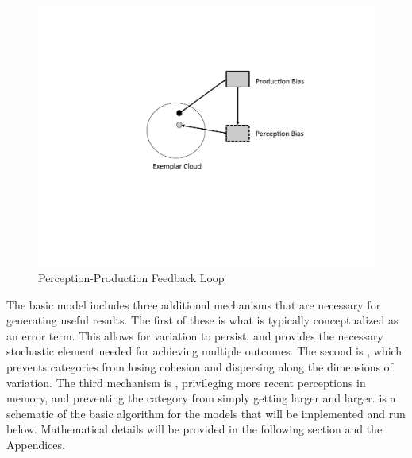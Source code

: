 \begin{figure}[H]

\begin{centering}
\includegraphics[scale=0.5]{figures/P-PLoop.pdf}\caption{\label{fig:Feedback Loop}Perception-Production Feedback Loop}
\par\end{centering}
\end{figure}

The basic  model includes three additional mechanisms that
are necessary for generating useful results. The first of these is
what is typically conceptualized as an error term. This allows for
variation to persist, and provides the necessary stochastic element
needed for achieving multiple outcomes. The second is ,
which prevents categories from losing cohesion and dispersing along
the dimensions of variation. The third mechanism is ,
privileging more recent perceptions in memory, and preventing the
category from simply getting larger and larger. 
is a schematic of the basic algorithm for the models that will be
implemented and run below. Mathematical details will be provided in
the following section and the Appendices. 


